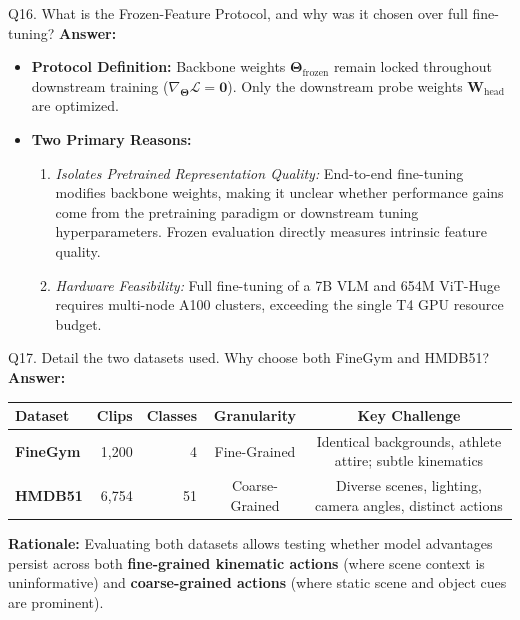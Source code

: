\documentclass[a4paper, 11pt]{article}
\begin{document}
\begin{questionbox}{Q16. What is the Frozen-Feature Protocol, and why was it chosen over full fine-tuning?}
\textbf{Answer:}
\begin{itemize}
    \item \textbf{Protocol Definition:} Backbone weights $\mathbf{\Theta}_{\text{frozen}}$ remain locked throughout downstream training ($\nabla_{\mathbf{\Theta}}\mathcal{L} = \mathbf{0}$). Only the downstream probe weights $\mathbf{W}_{\text{head}}$ are optimized.
    \item \textbf{Two Primary Reasons:}
    \begin{enumerate}
        \item \textit{Isolates Pretrained Representation Quality:} End-to-end fine-tuning modifies backbone weights, making it unclear whether performance gains come from the pretraining paradigm or downstream tuning hyperparameters. Frozen evaluation directly measures intrinsic feature quality.
        \item \textit{Hardware Feasibility:} Full fine-tuning of a 7B VLM and 654M ViT-Huge requires multi-node A100 clusters, exceeding the single T4 GPU resource budget.
    \end{enumerate}
\end{itemize}
\end{questionbox}

\begin{questionbox}{Q17. Detail the two datasets used. Why choose both FineGym and HMDB51?}
\textbf{Answer:}
\begin{center}
\small
\begin{tabular}{lrrcc}
\toprule
\textbf{Dataset} & \textbf{Clips} & \textbf{Classes} & \textbf{Granularity} & \textbf{Key Challenge} \\
\midrule
\textbf{FineGym} & 1,200 & 4 & Fine-Grained & Identical backgrounds, athlete attire; subtle kinematics \\
\textbf{HMDB51}  & 6,754 & 51 & Coarse-Grained & Diverse scenes, lighting, camera angles, distinct actions \\
\bottomrule
\end{tabular}
\end{center}
\textbf{Rationale:} Evaluating both datasets allows testing whether model advantages persist across both \textbf{fine-grained kinematic actions} (where scene context is uninformative) and \textbf{coarse-grained actions} (where static scene and object cues are prominent).
\end{questionbox}
\end{document}

